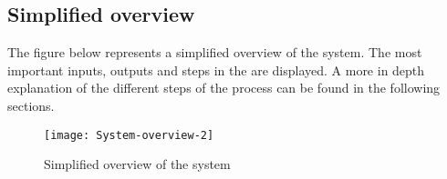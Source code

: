 \subsection{Simplified overview}
The figure below represents a simplified overview of the system. The most important inputs, outputs and steps in the are displayed. A more in depth explanation of the different steps of the process can be found in the following sections.
\begin{figure}[h]
\centering
\texttt{[image: System-overview-2]}
\caption{Simplified overview of the system}
\label{fig:overview}
\end{figure}